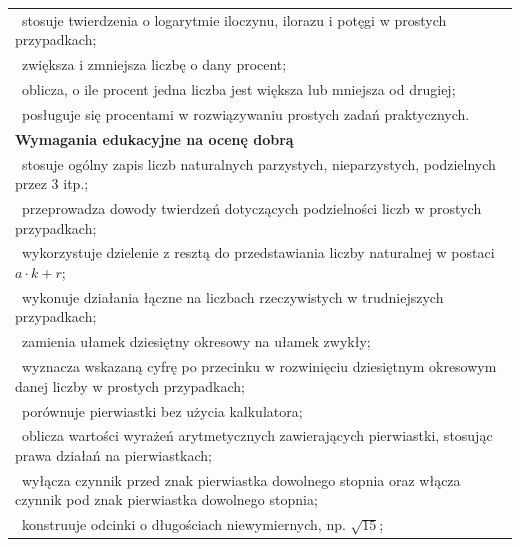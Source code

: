 \documentclass[12pt,a4paper]{article}
\begin{document}
\begin{longtable}{|p{16cm}|}
		\textbullet\ stosuje twierdzenia o logarytmie iloczynu, ilorazu i potęgi w prostych przypadkach; \\
		
		\textbullet\ zwiększa i zmniejsza liczbę o dany procent; \\
		
		\textbullet\ oblicza, o ile procent jedna liczba jest większa lub mniejsza od drugiej; \\
		
		\textbullet\ posługuje się procentami w rozwiązywaniu prostych zadań praktycznych. \\ \hline
		
		\textbf{Wymagania edukacyjne na ocenę dobrą} \\ \hline
		
		\textbullet\ stosuje ogólny zapis liczb naturalnych parzystych, nieparzystych, podzielnych przez $3$ itp.; \\
		
		\textbullet\ przeprowadza dowody twierdzeń dotyczących podzielności liczb w prostych przypadkach; \\
		
		\textbullet\ wykorzystuje dzielenie z resztą do przedstawiania liczby naturalnej w postaci $a \cdot k + r$; \\
		
		\textbullet\ wykonuje działania łączne na liczbach rzeczywistych w trudniejszych przypadkach; \\
		
		\textbullet\ zamienia ułamek dziesiętny okresowy na ułamek zwykły; \\
		
		\textbullet\ wyznacza wskazaną cyfrę po przecinku w rozwinięciu dziesiętnym okresowym danej liczby w prostych przypadkach; \\
		
		\textbullet\ porównuje pierwiastki bez użycia kalkulatora; \\
		
		\textbullet\ oblicza wartości wyrażeń arytmetycznych zawierających pierwiastki, stosując prawa działań na pierwiastkach; \\
		
		\textbullet\ wyłącza czynnik przed znak pierwiastka dowolnego stopnia oraz włącza czynnik pod znak pierwiastka dowolnego stopnia; \\
		
		\textbullet\ konstruuje odcinki o długościach niewymiernych, np. $\sqrt{15}$; \\
		

\end{longtable}
\end{document}

